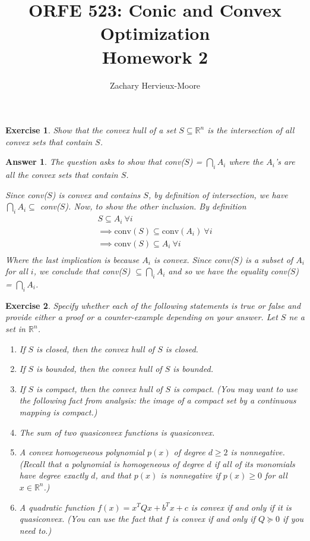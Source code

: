 \documentclass[12pt]{article}
\title{ORFE 523: Conic and Convex Optimization \\ Homework 2}
\author{Zachary Hervieux-Moore}
\date{\displaydate{date}}
\theoremstyle{colon}
\newtheorem{exercise}{Exercise}
\newtheorem*{answer}{Answer}
\begin{document}
\maketitle

\clearpage

\begin{exercise}
  Show that the convex hull of a set $S \subseteq \mathbb{R}^n$ is the intersection of all convex sets that contain $S$.
\end{exercise}

\begin{answer}
  The question asks to show that conv($S$) = $\bigcap_i A_i$ where the $A_i$'s are all the convex sets that contain $S$.

  Since conv($S$) is convex and contains $S$, by definition of intersection, we have $\bigcap_i A_i \subseteq$ conv($S$). Now, to show the other inclusion. By definition
  \begin{gather*}
    S \subseteq A_i \ \forall i \\
    \implies \text{conv}(S) \subseteq \text{conv}(A_i) \ \forall i \\
    \implies \text{conv}(S) \subseteq A_i \ \forall i \\
  \end{gather*}
  Where the last implication is because $A_i$ is convex. Since conv($S$) is a subset of $A_i$ for all $i$, we conclude that conv($S$) $\subseteq \bigcap_i A_i$ and so we have the equality conv($S$) = $\bigcap_i A_i$.
\end{answer}

\clearpage

\begin{exercise}
  Specify whether each of the following statements is true or false and provide either a proof or a counter-example depending on your answer. Let $S$ ne a set in $\mathbb{R}^n$.
  \begin{enumerate}[label=\roman*)]
    \item If $S$ is closed, then the convex hull of $S$ is closed.
    \item If $S$ is bounded, then the convex hull of $S$ is bounded.
    \item If $S$ is compact, then the convex hull of $S$ is compact. (You may want to use the following fact from analysis: the image of a compact set by a continuous mapping is compact.)
    \item The sum of two quasiconvex functions is quasiconvex.
    \item A convex homogeneous polynomial $p(x)$ of degree $d \geq 2$ is nonnegative. (Recall that a polynomial is homogeneous of degree $d$ if all of its monomials have degree exactly $d$, and that $p(x)$ is nonnegative if $p(x) \geq 0$ for all $x \in \mathbb{R}^n$.)
    \item A quadratic function $f(x) = x^T Q x + b^T x + c$ is convex if and only if it is quasiconvex. (You can use the fact that $f$ is convex if and only if $Q \succeq 0$ if you need to.)
  \end{enumerate}
\end{exercise}
\end{document}
